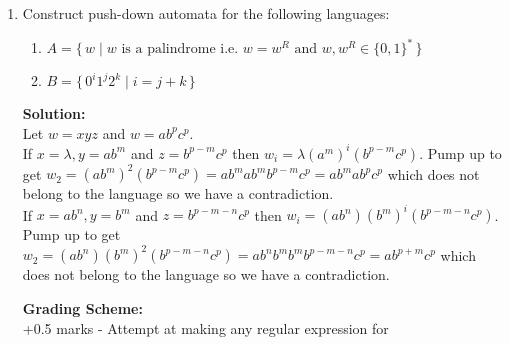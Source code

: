 \documentclass[11pt, article, oneside]{memoir}
\newcommand{\set}[1]{\{\, #1\, \}}
\begin{document}
\begin{enumerate}
    \item
        Construct push-down automata for the following languages:
        \begin{enumerate}
            \item
                \(A = \set{w \mid w \text{ is a palindrome i.e. } w = w^R \text{ and } w, w^R \in \{0, 1\}^*}\) 
            \item
                \(B = \set{ {0^i}{1^j}{2^k} \mid i = j + k}\)
        \end{enumerate}

        \textbf{Solution:}
        \\Let \(w = xyz\) and \(w = ab^pc^p\).
        \\If \(x = \lambda, y = ab^m\) and \(z = b^{p - m}c^p\) then \(w_i = \lambda(a^m)^i(b^{p - m}c^p)\). Pump up to get \(w_2 = (ab^m)^2(b^{p - m}c^p) = ab^mab^mb^{p - m}c^p = ab^mab^pc^p\) which does not belong to the language so we have a contradiction.
        \\If \(x = ab^n, y = b^m\) and \(z = b^{p - m - n}c^p\) then \(w_i = (ab^n)(b^m)^i(b^{p - m - n}c^p)\). Pump up to get \(w_2 = (ab^n)(b^m)^2(b^{p - m - n}c^p) = ab^nb^mb^mb^{p - m - n}c^p = ab^{p + m}c^p\) which does not belong to the language so we have a contradiction.

        \textbf{Grading Scheme:}
        \\+0.5 marks - Attempt at making any regular expression for
        
\end{enumerate}
\end{document}
